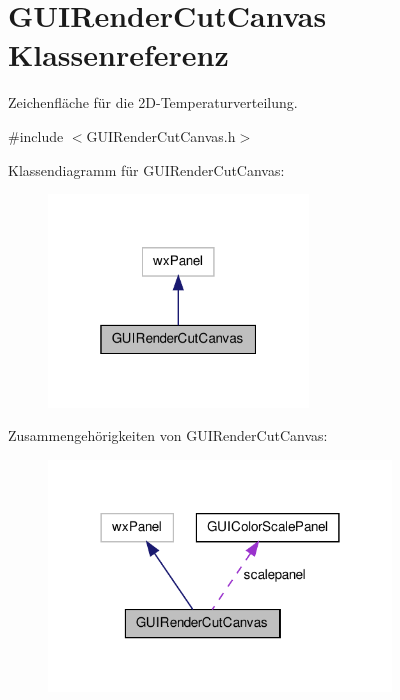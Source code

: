 \hypertarget{classGUIRenderCutCanvas}{\section{G\-U\-I\-Render\-Cut\-Canvas Klassenreferenz}
\label{classGUIRenderCutCanvas}
}


Zeichenfläche für die 2\-D-\/\-Temperaturverteilung.  




{\ttfamily \#include $<$G\-U\-I\-Render\-Cut\-Canvas.\-h$>$}



Klassendiagramm für G\-U\-I\-Render\-Cut\-Canvas\-:\nopagebreak
\begin{figure}[H]
\begin{center}
\leavevmode
\includegraphics[width=196pt]{classGUIRenderCutCanvas__inherit__graph}
\end{center}
\end{figure}


Zusammengehörigkeiten von G\-U\-I\-Render\-Cut\-Canvas\-:\nopagebreak
\begin{figure}[H]
\begin{center}
\leavevmode
\includegraphics[width=258pt]{classGUIRenderCutCanvas__coll__graph}
\end{center}
\end{figure}
